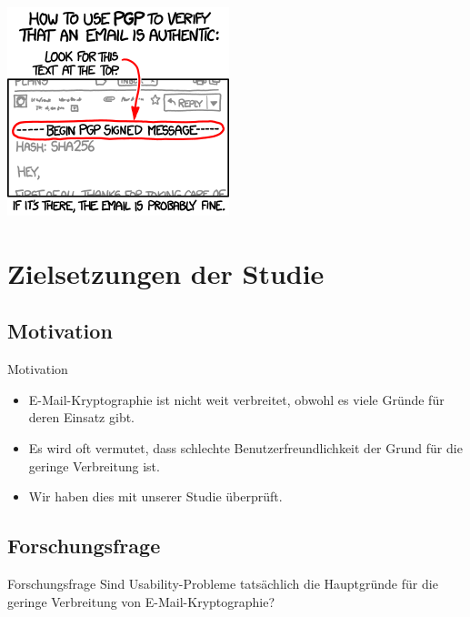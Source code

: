 \documentclass[]{beamer}
\begin{document}
\begin{frame}[plain]
	\begin{center}
		\includegraphics[scale=0.7]{pic/pgp.png}
	\end{center}
\end{frame}

\begin{frame}[plain]
	\titlepage
\end{frame}


\section{Zielsetzungen der Studie}

\subsection{Motivation}
\begin{frame}{Motivation}
\begin{itemize}
	\item E-Mail-Kryptographie ist nicht weit verbreitet, obwohl es viele Gründe für deren Einsatz gibt.
	\item Es wird oft vermutet, dass schlechte Benutzerfreundlichkeit der Grund für die geringe Verbreitung ist.
	\item Wir haben dies mit unserer Studie überprüft.
\end{itemize}
\end{frame}


\subsection{Forschungsfrage}
\begin{frame}{Forschungsfrage}
	Sind Usability-Probleme tatsächlich die Hauptgründe für die geringe Verbreitung von E-Mail-Kryptographie?

	\vspace{1.2cm}
\end{frame}
\end{document}
